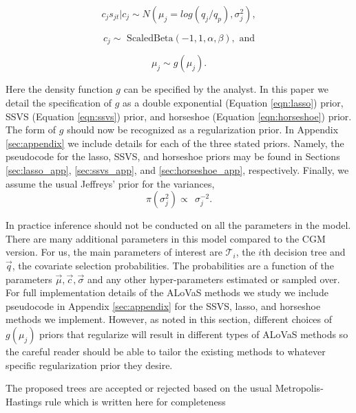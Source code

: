 \begin{equation}\label{eqn:alovas1}
c_js_{jt} \vert c_j \sim N\left(\mu_j=log(q_j/q_p),\sigma_j^2\right),
\end{equation}

\begin{equation}\label{eqn:alovas2}
c_j \sim \text{ ScaledBeta}(-1,1,\alpha, \beta), \text{   and}	
\end{equation}

\begin{equation}\label{eqn:flavor_prior}
\mu_j \sim g(\mu_j). 
\end{equation}

Here the density function $g$ can be specified by the analyst. In this paper we detail the specification of $g$ as a double exponential (Equation \ref{eqn:lasso}) prior, SSVS (Equation \ref{eqn:ssvs}) prior, and horseshoe (Equation \ref{eqn:horseshoe}) prior. The form of $g$ should now be recognized as a regularization prior. In Appendix \ref{sec:appendix} we include details for each of the three stated priors. Namely, the pseudocode for the lasso, SSVS, and horseshoe priors may be found in Sections \ref{sec:lasso_app}, \ref{sec:ssvs_app}, and \ref{sec:horseshoe_app}, respectively.
Finally, we assume the usual Jeffreys' prior for the variances, 
\begin{equation}
\pi(\sigma^2_j) \propto \ \  \sigma^{-2}_j. 
\end{equation}

In practice inference should not be conducted on all the parameters in the model. There are many additional parameters in this model compared to the CGM version. For us, the main parameters of interest are $\mathcal{T}_i$, the $i$th decision tree and $\vec{q}$, the covariate selection probabilities. The probabilities are a function of the parameters $\vec{\mu},\vec{c},\vec{\sigma}$ and any other hyper-parameters estimated or sampled over. For full implementation details of the ALoVaS methods we study we include pseudocode in Appendix \ref{sec:appendix} for the SSVS, lasso, and horseshoe methods we implement. However, as noted in this section, different choices of $g(\mu_j)$ priors that regularize will result in different types of ALoVaS methods so the careful reader should be able to tailor the existing methods to whatever specific regularization prior they desire. 

 The proposed trees are accepted or rejected based on the usual Metropolis-Hastings rule which is written here for completeness
 
